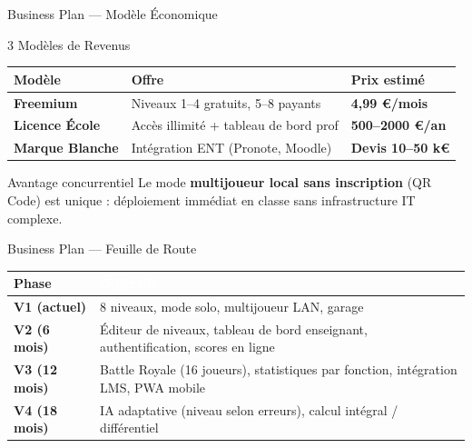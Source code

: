 \documentclass[aspectratio=169,12pt]{beamer}
\newcommand{\success}[1]{\textcolor{mygreen}{\textbf{#1}}}
\begin{document}
\begin{frame}{Business Plan --- Mod\`ele \'Economique}
  \begin{block}{3 Mod\`eles de Revenus}
  \end{block}
  \begin{tabular}{p{2.5cm}p{3.5cm}p{3.5cm}}
    \toprule
    \textcolor{mycyan}{\textbf{Mod\`ele}} & \textcolor{myyellow}{\textbf{Offre}} & \textcolor{mylightslate}{\textbf{Prix estim\'e}}\\
    \midrule
    \success{Freemium} &
    Niveaux 1--4 gratuits, 5--8 payants &
    \textbf{4,99 \euro/mois}\\[4pt]
    \success{Licence \'Ecole} &
    Acc\`es illimit\'e + tableau de bord prof &
    \textbf{500--2000 \euro/an}\\[4pt]
    \success{Marque Blanche} &
    Int\'egration ENT (Pronote, Moodle) &
    \textbf{Devis 10--50 k\euro}\\
    \bottomrule
  \end{tabular}
  \vspace{0.4cm}
  \begin{alertblock}{Avantage concurrentiel}
    Le mode \textbf{multijoueur local sans inscription} (QR Code) est unique :
    d\'eploiement imm\'ediat en classe sans infrastructure IT complexe.
  \end{alertblock}
\end{frame}

\begin{frame}{Business Plan --- Feuille de Route}
  \begin{tabular}{p{2cm}p{8cm}}
    \toprule
    \textcolor{mycyan}{\textbf{Phase}} & \textcolor{white}{\textbf{Objectifs}}\\
    \midrule
    \textbf{V1 (actuel)} &
    8 niveaux, mode solo, multijoueur LAN, garage\\[4pt]
    \textbf{V2 (6 mois)} &
    \'Editeur de niveaux, tableau de bord enseignant,
    authentification, scores en ligne\\[4pt]
    \textbf{V3 (12 mois)} &
    Battle Royale (16 joueurs), statistiques par fonction,
    int\'egration LMS, PWA mobile\\[4pt]
    \textbf{V4 (18 mois)} &
    IA adaptative (niveau selon erreurs), calcul int\'egral / diff\'erentiel\\
    \bottomrule
  \end{tabular}
\end{frame}
\end{document}
